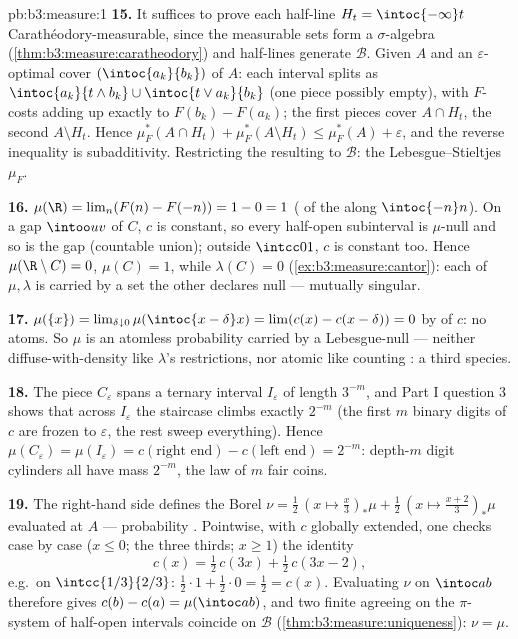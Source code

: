\begin{solution}{pb:b3:measure:1}
\textbf{15.} It suffices to prove each half-line $H_t =
\intoc{-\infty}t$ Carath\'eodory-measurable, since the
measurable sets form a $\sigma$-algebra
(\cref{thm:b3:measure:caratheodory}) and half-lines generate
$\mathcal B$. Given $A$ and an $\varepsilon$-optimal cover
$(\intoc{a_k}{b_k})$ of $A$: each interval splits as
$\intoc{a_k}{t\wedge b_k} \cup \intoc{t \vee a_k}{b_k}$ (one
piece possibly empty), with $F$-costs adding up exactly to
$F(b_k) - F(a_k)$; the first pieces cover $A \cap H_t$, the
second $A \setminus H_t$. Hence $\mu_F^*(A\cap H_t) +
\mu_F^*(A\setminus H_t) \leq \mu_F^*(A) + \varepsilon$, and
the reverse inequality is subadditivity. Restricting the
resulting  to $\mathcal B$: the Lebesgue--Stieltjes
 $\mu_F$.

\textbf{16.} $\mu(\R) = \lim_n(F(n) - F(-n)) = 1 - 0 = 1$
( of the  along $\intoc{-n}n$). On a gap
$\intoo uv$ of $C$, $c$ is constant, so every half-open
subinterval is $\mu$-null and so is the gap (countable
union); outside $\intcc01$, $c$ is constant too. Hence
$\mu(\R\setminus C) = 0$, $\mu(C) = 1$, while $\lambda(C) =
0$ (\cref{ex:b3:measure:cantor}): each of $\mu, \lambda$ is
carried by a set the other declares null --- mutually
singular.

\textbf{17.} $\mu(\{x\}) = \lim_{\delta\downarrow0}
\mu(\intoc{x-\delta}x) = \lim(c(x) - c(x-\delta)) = 0$ by
 of $c$: no atoms. So $\mu$ is an atomless
probability  carried by a Lebesgue-null  ---
neither diffuse-with-density like $\lambda$'s restrictions,
nor atomic like counting : a third species.

\textbf{18.} The piece $C_\varepsilon$ spans a ternary
interval $I_\varepsilon$ of length $3^{-m}$, and Part I
question 3 shows that across $I_\varepsilon$ the staircase
climbs exactly $2^{-m}$ (the first $m$ binary digits of $c$
are frozen to $\varepsilon$, the rest sweep everything).
Hence $\mu(C_\varepsilon) = \mu(I_\varepsilon) =
c(\text{right end}) - c(\text{left end}) = 2^{-m}$: depth-$m$
digit cylinders all have mass $2^{-m}$, the law of $m$ fair
coins.

\textbf{19.} The right-hand side defines the Borel 
$\nu = \frac12\,(x \mapsto \tfrac x3)_*\mu + \frac12\,(x
\mapsto \tfrac{x+2}3)_*\mu$ evaluated at $A$ --- probability
. Pointwise, with $c$ globally extended, one checks
case by case ($x \leq 0$; the three thirds; $x \geq 1$) the
identity
\[
c(x) = \tfrac12\,c(3x) + \tfrac12\,c(3x - 2),
\]
e.g.\ on $\intcc{1/3}{2/3}$: $\frac12\cdot1 + \frac12\cdot0 =
\frac12 = c(x)$. Evaluating $\nu$ on $\intoc ab$ therefore
gives $c(b) - c(a) = \mu(\intoc ab)$, and two finite 
agreeing on the $\pi$-system of half-open intervals coincide
on $\mathcal B$ (\cref{thm:b3:measure:uniqueness}): $\nu =
\mu$.


\end{solution}
